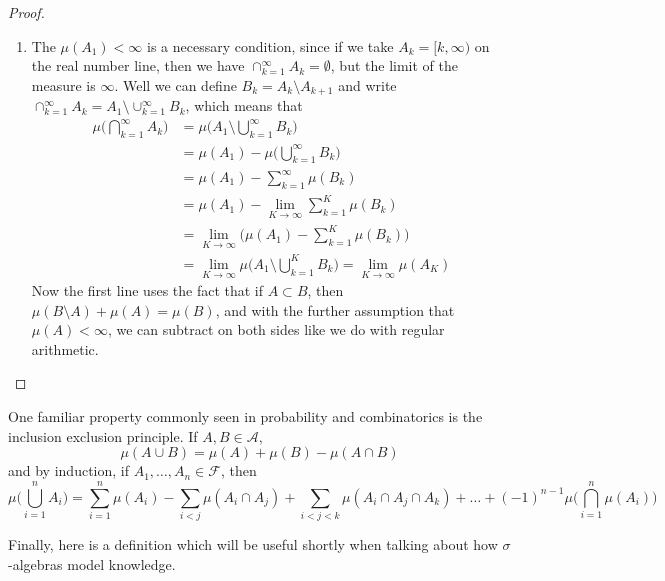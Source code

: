 \begin{proof}
\begin{enumerate}
    \item The $\mu(A_1) < \infty$ is a necessary condition, since if we take $A_k = [k, \infty)$ on the real number line, then we have $\cap_{k=1}^\infty A_k = \emptyset$, but the limit of the measure is $\infty$. Well we can define $B_k = A_k \setminus A_{k+1}$ and write $\cap_{k=1}^\infty A_k = A_1 \setminus \cup_{k=1}^\infty B_k$, which means that 
    \begin{align}
      \mu\bigg( \bigcap_{k=1}^\infty A_k \bigg) & = \mu\bigg( A_1 \setminus \bigcup_{k=1}^\infty B_k \bigg) \\
      & = \mu(A_1) - \mu\bigg( \bigcup_{k=1}^\infty B_k\bigg) \\
      & = \mu(A_1) - \sum_{k=1}^\infty \mu(B_k) \\
      & = \mu(A_1) - \lim_{K \rightarrow \infty} \sum_{k=1}^K \mu(B_k) \\
      & = \lim_{K \rightarrow \infty} \bigg( \mu(A_1) - \sum_{k=1}^K \mu(B_k) \bigg) \\
      & = \lim_{K \rightarrow \infty} \mu \bigg( A_1 \setminus \bigcup_{k=1}^K B_k \bigg) = \lim_{K \rightarrow \infty} \mu(A_K)
    \end{align}
    Now the first line uses the fact that if $A \subset B$, then $\mu(B \setminus A) + \mu(A) = \mu(B)$, and with the further assumption that $\mu(A) < \infty$, we can subtract on both sides like we do with regular arithmetic. 
  \end{enumerate}
  \end{proof}

  \begin{theorem}
    One familiar property commonly seen in probability and combinatorics is the inclusion exclusion principle. If $A, B \in \mathcal{A}$, 
    \begin{equation}
      \mu(A \cup B) = \mu(A) + \mu(B) - \mu(A \cap B)
    \end{equation}
    and by induction, if $A_1, \ldots, A_n \in \mathcal{F}$, then 
    \begin{equation}
      \mu\bigg( \bigcup_{i=1}^n A_i \bigg) = \sum_{i=1}^n \mu(A_i) - \sum_{i < j} \mu(A_i \cap A_j) + \sum_{i < j < k} \mu(A_i \cap A_j \cap A_k) + \ldots + (-1)^{n-1} \mu\bigg( \bigcap_{i=1}^n \mu(A_i) \bigg)
    \end{equation}
  \end{theorem}

  Finally, here is a definition which will be useful shortly when talking about how $\sigma$-algebras model knowledge. 

